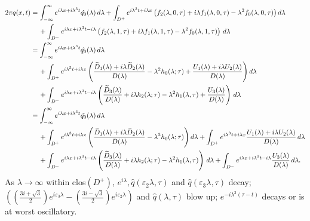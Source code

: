 \begin{equation*}
\begin{aligned}
2\pi q(x, t) &= \int_{-\infty}^\infty e^{i\lambda x + i \lambda^3 t}\hat{q_0}(\lambda)\,d\lambda + \int_{D^+} e^{i \lambda^3 t+i\lambda x}\left(f_2(\lambda, 0, \tau) + i \lambda f_1(\lambda, 0, \tau) - \lambda^2 f_0(\lambda, 0, \tau)\right)d\lambda \\
&\hspace{1pc}+\int_{D^-} e^{i\lambda x+i \lambda^3 t-i\lambda} \left(f_2(\lambda, 1, \tau) + i \lambda f_1(\lambda, 1, \tau) - \lambda^2 f_0(\lambda, 1, \tau)\right)\,d\lambda\\
&= \int_{-\infty}^\infty e^{i\lambda x + i \lambda^3 t}\hat{q_0}(\lambda)\,d\lambda \\
&\hspace{1pc}+ \int_{D^+} e^{i \lambda^3 t+i\lambda x}\left( \frac{\widetilde{D}_1(\lambda)+i \lambda\widetilde{D}_2(\lambda)}{D(\lambda)} - \lambda^2 h_0(\lambda; \tau) + \frac{U_1(\lambda) + i \lambda  U_2(\lambda)}{D(\lambda)} \right)d\lambda \\
&\hspace{1pc}+ \int_{D^-} e^{i\lambda x+i \lambda^3 t-i\lambda} \left(\frac{\widetilde{D}_3(\lambda)}{D(\lambda)} + i \lambda h_2(\lambda; \tau) - \lambda^2 h_1(\lambda, \tau) + \frac{U_3(\lambda)}{D(\lambda)} \right)\,d\lambda\\
&= \int_{-\infty}^\infty e^{i\lambda x + i \lambda^3 t}\hat{q_0}(\lambda)\,d\lambda \\
&\hspace{1pc}+ \int_{D^+} e^{i \lambda^3 t+i\lambda x}\left( \frac{\widetilde{D}_1(\lambda)+i \lambda\widetilde{D}_2(\lambda)}{D(\lambda)} - \lambda^2 h_0(\lambda; \tau) \right)d\lambda + \int_{D^+} e^{i \lambda^3 t+i\lambda x}\frac{U_1(\lambda) + i \lambda  U_2(\lambda)}{D(\lambda)}\, d\lambda  \\
&\hspace{1pc}+ \int_{D^-} e^{i\lambda x+i \lambda^3 t-i\lambda} \left(\frac{\widetilde{D}_3(\lambda)}{D(\lambda)} + i \lambda h_2(\lambda; \tau) - \lambda^2 h_1(\lambda, \tau)\right)\,d\lambda + \int_{D^-} e^{i\lambda x+i \lambda^3 t-i\lambda} \frac{U_3(\lambda)}{D(\lambda)} \,d\lambda. \\
\end{aligned}
\end{equation*}
As $\lambda \rightarrow \infty$ within clos$(D^+)$, $e^{i\lambda}, \hat{q}(\varepsilon_2\lambda,\tau)$ and $\hat{q}(\varepsilon_3\lambda,\tau)$ decay; $\left(\left(\frac{3i + \sqrt{3}}{2}\right)e^{i\varepsilon_3\lambda} - \left(\frac{3i - \sqrt{3}}{2}\right)e^{i\varepsilon_2\lambda}\right)$ and $\hat{q}(\lambda,\tau)$ blow up; $e^{-i \lambda^3 (\tau - t)}$ decays or is at worst oscillatory.

